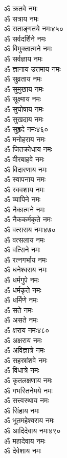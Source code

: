 \begin{multicols}{2}
\begin{flushleft}
ॐ क्रतवे नमः\\
ॐ सत्राय नमः\\
ॐ सताङ्गतये नमः\hfill ४५०\\
ॐ सर्वदर्शिने नमः\\
ॐ विमुक्तात्मने नमः\\
ॐ सर्वज्ञाय नमः\\
ॐ ज्ञानाय उत्तमाय नमः\\
ॐ सुव्रताय नमः\\
ॐ सुमुखाय नमः\\
ॐ सूक्ष्माय नमः\\
ॐ सुघोषाय नमः\\
ॐ सुखदाय नमः\\
ॐ सुहृदे नमः\hfill ४६०\\
ॐ मनोहराय नमः\\
ॐ जितक्रोधाय नमः\\
ॐ वीरबाहवे नमः\\
ॐ विदारणाय नमः\\
ॐ स्वापनाय नमः\\
ॐ स्ववशाय नमः\\
ॐ व्यापिने नमः\\
ॐ नैकात्मने नमः\\
ॐ नैककर्मकृते नमः\\
ॐ वत्सराय नमः\hfill ४७०\\
ॐ वत्सलाय नमः\\
ॐ वत्सिने नमः\\
ॐ रत्नगर्भाय नमः\\
ॐ धनेश्वराय नमः\\
ॐ धर्मगुपे नमः\\
ॐ धर्मकृते नमः\\
ॐ धर्मिणे नमः\\
ॐ सते नमः\\
ॐ असते नमः\\
ॐ क्षराय नमः\hfill ४८०\\
ॐ अक्षराय नमः\\
ॐ अविज्ञात्रे नमः\\
ॐ सहस्रांशवे नमः\\
ॐ विधात्रे नमः\\
ॐ कृतलक्षणाय नमः\\
ॐ गभस्तिनेमये नमः\\
ॐ सत्त्वस्थाय नमः\\
ॐ सिंहाय नमः\\
ॐ भूतमहेश्वराय नमः\\
ॐ आदिदेवाय नमः\hfill ४९०\\
ॐ महादेवाय नमः\\
ॐ देवेशाय नमः\\

\end{flushleft}
\end{multicols}

